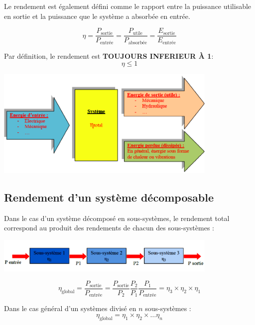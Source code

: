 \documentclass[10pt,fleqn]{article} %
\begin{document}
\begin{defi}
    Le rendement est également défini comme le rapport entre la puissance utilisable en sortie et la puissance que le système a absorbée en entrée. 
    
    $$\eta = \frac{P_{\text{sortie}}}{P_{\text{entrée}}} = \frac{P_{\text{utile}}}{P_{\text{absorbée}}} = \frac{E_{\text{sortie}}}{E_{\text{entrée}}}$$
    
\parcoeur Par définition, le rendement est \textbf{TOUJOURS INFERIEUR À 1}: 
$$\eta \leq 1$$
\end{defi}

\begin{center}
    \includegraphics[width=0.8\textwidth]{images/rendement.png}
\end{center}

\subsection{Rendement d'un système décomposable}
Dans le cas d'un système décomposé en sous-systèmes, le rendement total correspond au produit des rendements de chacun des sous-systèmes : 
\begin{center}
    \includegraphics[width=0.8\textwidth]{images/rendement_multiple.png}
\end{center}

\begin{exemple}
    $$\eta_{\text{global}} = \frac{P_{\text{sortie}}}{P_{\text{entrée}}} = \frac{P_{\text{sortie}}}{P_{\text{2}}} \frac{P_{\text{2}}}{P_{\text{1}}} \frac{P_{\text{1}}}{P_{\text{entrée}}} = \eta_3 \times \eta_2 \times \eta_1$$
\end{exemple}
    \begin{defi}
     Dans le cas général d'un systèmes divisé en $n$ sous-systèmes :  
       $$ \eta_{\text{global}} = \eta_1 \times \eta_2 \times \dots \eta_n $$
    \end{defi}
\end{document}
